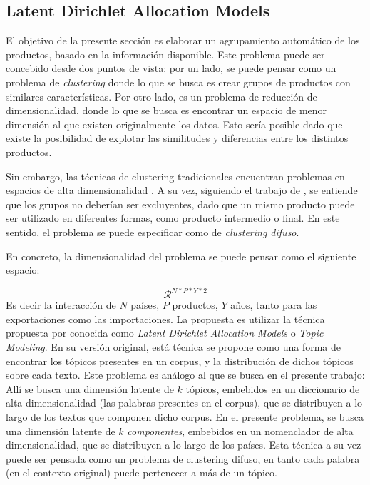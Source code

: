 \documentclass[class=article, crop=false]{standalone}
\begin{document}

	
\subsection{Latent Dirichlet Allocation Models}
	
El objetivo de la presente sección es elaborar un agrupamiento automático de los productos, basado en la información disponible. Este problema puede ser concebido desde dos puntos de vista: por un lado, se puede pensar como un problema de \textit{clustering} donde lo que se busca es crear grupos de productos con similares características. Por otro lado, es un problema de reducción de dimensionalidad, donde lo que se busca es encontrar un espacio de menor dimensión al que existen originalmente los datos. Esto sería posible dado que existe la posibilidad de explotar las similitudes y diferencias entre los distintos productos. 

Sin embargo, las técnicas de clustering tradicionales encuentran problemas en espacios de alta dimensionalidad \citep{aggarwal2001surprising}. A su vez, siguiendo el trabajo de \cite{molinari2016especializacion}, se entiende que los grupos no deberían ser excluyentes, dado que un mismo producto puede ser utilizado en diferentes formas, como producto intermedio o final. En este sentido, el problema se puede especificar como de \textit{clustering difuso}.
	
En concreto, la dimensionalidad del problema se puede pensar como el siguiente espacio:

$$
\mathcal{R}^{N*P*Y*2}
$$
Es decir la interacción de $N$ países, $P$ productos, $Y$ años, tanto para las exportaciones como las importaciones.
La propuesta es utilizar la técnica propuesta por \cite{blei2003latent} conocida como \textit{Latent Dirichlet Allocation Models} o \textit{Topic Modeling}. En su versión original, está técnica se propone como una forma de encontrar los tópicos presentes en un corpus, y la distribución de dichos tópicos sobre cada texto. Este problema es análogo al que se busca en el presente trabajo: Allí se busca una dimensión latente de $k$ tópicos, embebidos en un diccionario de alta dimensionalidad (las palabras presentes en el corpus), que se distribuyen a lo largo de los textos que componen dicho corpus. En el presente problema, se busca una dimensión latente de $k$ \textit{componentes}, embebidos en un nomenclador de alta dimensionalidad, que se distribuyen a lo largo de los países. Esta técnica a su vez puede ser pensada como un problema de clustering difuso, en tanto cada palabra (en el contexto original) puede pertenecer a más de un tópico.
\end{document}
